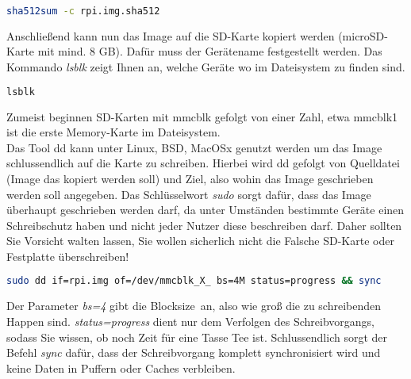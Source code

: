 \documentclass[paper=a4,fontsize=11pt]{scrartcl}%
\numberwithin{equation}{section}
\begin{document}
\begin{lstlisting}[style=Bash, language=Bash]
sha512sum -c rpi.img.sha512
		\end{lstlisting}
Anschließend kann nun das Image auf die SD-Karte kopiert werden (microSD-Karte mit mind. 8 GB). Dafür muss der  Gerätename festgestellt werden. Das Kommando \emph{lsblk} zeigt Ihnen an, welche Geräte wo im Dateisystem zu finden sind.
\begin{lstlisting}[style=Bash, language=Bash]
lsblk
\end{lstlisting}
Zumeist beginnen SD-Karten mit mmcblk gefolgt von einer Zahl, etwa mmcblk1 ist die erste Memory-Karte im Dateisystem.\\
Das Tool dd kann unter Linux, BSD, MacOSx genutzt werden um das Image schlussendlich auf die Karte zu schreiben. Hierbei wird dd gefolgt von Quelldatei (Image das kopiert werden soll) und Ziel, also wohin das Image geschrieben werden soll angegeben. Das Schlüsselwort \emph{sudo} sorgt dafür, dass das Image überhaupt geschrieben werden darf, da unter Umständen bestimmte Geräte einen Schreibschutz haben und nicht jeder Nutzer diese beschreiben darf. Daher sollten Sie Vorsicht walten lassen, Sie wollen sicherlich nicht die Falsche SD-Karte oder Festplatte überschreiben!
\begin{lstlisting}[style=Bash, language=Bash]
sudo dd if=rpi.img of=/dev/mmcblk_X_ bs=4M status=progress && sync
\end{lstlisting}
Der Parameter \emph{bs=4} gibt die \glqq Blocksize\grqq\ an, also wie groß die zu schreibenden Happen sind. \emph{status=progress} dient nur dem Verfolgen des Schreibvorgangs, sodass Sie wissen, ob noch Zeit für eine Tasse Tee ist. Schlussendlich sorgt der Befehl \emph{sync} dafür, dass der Schreibvorgang komplett synchronisiert wird und keine Daten in Puffern oder Caches verbleiben.
\end{document}
